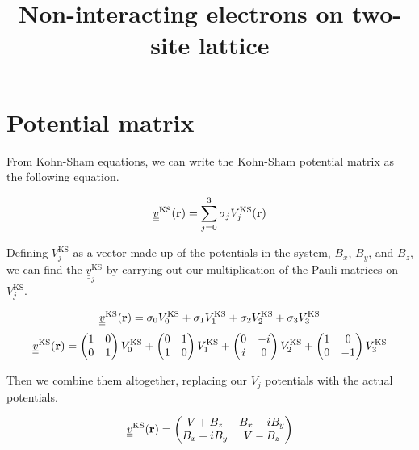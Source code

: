 \documentclass[10pt]{revtex4-1}
\newcommand{\bfr}{{\bf r}}
\begin{document}
\title{Non-interacting electrons on two-site lattice}

\section{Potential matrix}

From Kohn-Sham equations, we can write the Kohn-Sham potential matrix as the following equation.

\begin{equation}
  \underline{\underline{v}}^{\text{KS}}(\bfr) = \sum^3_{j=0} \sigma_j V_j^{\text{KS}}(\bfr)
\end{equation}

Defining $V_j^{\text{KS}}$ as a vector made up of the potentials in the system, $B_x$, $B_y$, and $B_z$, we can find the $\underline{\underline{v}}^{\text{KS}}_j$ by carrying out our multiplication of the Pauli matrices on $V_j^{\text{KS}}$.

\begin{equation*}
  \underline{\underline{v}}^{\text{KS}}(\bfr) = \sigma_0 V_0^{\text{KS}} + \sigma_1 V_1^{\text{KS}} + \sigma_2 V_2^{\text{KS}} + \sigma_3 V_3^{\text{KS}}
\end{equation*}
\begin{equation*}
  \underline{\underline{v}}^{\text{KS}}(\bfr) =
  \begin{pmatrix}
    1 & 0 \\
    0 & 1 \\
  \end{pmatrix}
  V_0^{\text{KS}} +
  \begin{pmatrix}
    0 & 1 \\
    1 & 0 \\
  \end{pmatrix}
  V_1^{\text{KS}} +
  \begin{pmatrix}
    0 & -i \\
    i & 0 \\
  \end{pmatrix}
  V_2^{\text{KS}} +
  \begin{pmatrix}
    1 & 0 \\
    0 & -1 \\
  \end{pmatrix}
  V_3^{\text{KS}}
\end{equation*}

Then we combine them altogether, replacing our $V_j$ potentials with the actual potentials.

\begin{equation*}
  \underline{\underline{v}}^{\text{KS}}(\bfr) =
  \begin{pmatrix}
    V + B_z & B_x - iB_y \\
    B_x + iB_y & V - B_z \\
  \end{pmatrix}
\end{equation*}
\end{document}
